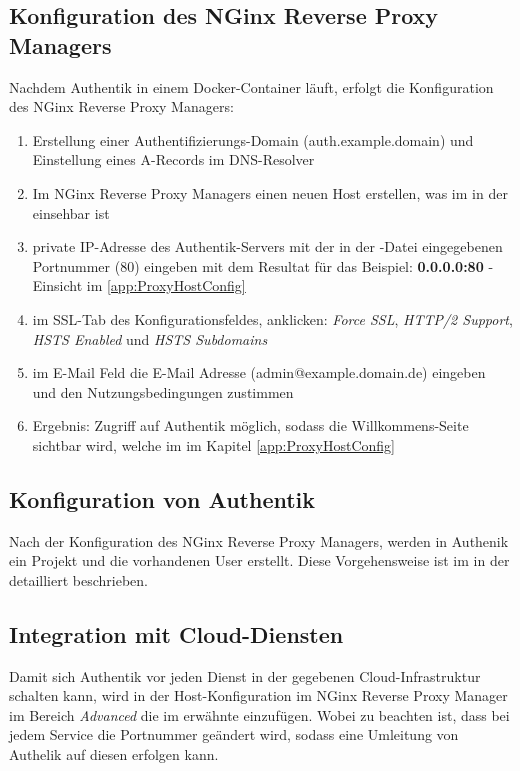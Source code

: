 \subsection{Konfiguration des NGinx Reverse Proxy Managers}
\label{sec:Konfiguration des NGinx Reverse Proxy Managers}
Nachdem Authentik in einem Docker-Container läuft, erfolgt die Konfiguration des NGinx Reverse Proxy Managers:
\begin{enumerate}[label=\arabic*.]
    \item Erstellung einer Authentifizierungs-Domain (auth.example.domain) und Einstellung eines A-Records im DNS-Resolver
    \item Im NGinx Reverse Proxy Managers einen neuen Host erstellen, was im  in der  einsehbar ist
    \item private IP-Adresse des Authentik-Servers mit der in der \textbf{}-Datei eingegebenen Portnummer (80) eingeben 
    mit dem Resultat für das Beispiel: \textbf{0.0.0.0:80} - Einsicht im \ref{app:ProxyHostConfig} 
    \item im SSL-Tab des Konfigurationsfeldes, anklicken: \textit{Force SSL}, \textit{HTTP/2 Support}, \textit{HSTS Enabled} und \textit{HSTS Subdomains}
    \item im E-Mail Feld die E-Mail Adresse (admin@example.domain.de) eingeben und den Nutzungsbedingungen zustimmen
    \item Ergebnis: Zugriff auf Authentik möglich, sodass die Willkommens-Seite sichtbar wird, welche im  im Kapitel 
    \ref{app:ProxyHostConfig} 
\end{enumerate}

\subsection{Konfiguration von Authentik}
\label{sec: Konfiguration von Authentik}
Nach der Konfiguration des NGinx Reverse Proxy Managers, werden in Authenik ein Projekt und die vorhandenen User erstellt. Diese Vorgehensweise 
ist im  in der  detailliert beschrieben.


\subsection{Integration mit Cloud-Diensten}
\label{sec:Integration mit Cloud-Diensten}
Damit sich Authentik vor jeden Dienst in der gegebenen Cloud-Infrastruktur schalten kann, wird in der Host-Konfiguration im NGinx Reverse 
Proxy Manager im Bereich \textit{Advanced} die im  erwähnte  einzufügen. Wobei zu beachten ist, 
dass bei jedem Service die Portnummer geändert wird, sodass eine Umleitung von Authelik auf diesen erfolgen kann.

